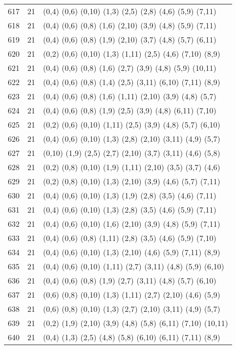 {\begin{longtable}{lll}
617 & 21 & (0,4) (0,6) (0,10) (1,3) (2,5) (2,8) (4,6) (5,9) (7,11) \\
618 & 21 & (0,4) (0,6) (0,8) (1,6) (2,10) (3,9) (4,8) (5,9) (7,11) \\
619 & 21 & (0,4) (0,6) (0,8) (1,9) (2,10) (3,7) (4,8) (5,7) (6,11) \\
620 & 21 & (0,2) (0,6) (0,10) (1,3) (1,11) (2,5) (4,6) (7,10) (8,9) \\
621 & 21 & (0,4) (0,6) (0,8) (1,6) (2,7) (3,9) (4,8) (5,9) (10,11) \\
622 & 21 & (0,4) (0,6) (0,8) (1,4) (2,5) (3,11) (6,10) (7,11) (8,9) \\
623 & 21 & (0,4) (0,6) (0,8) (1,6) (1,11) (2,10) (3,9) (4,8) (5,7) \\
624 & 21 & (0,4) (0,6) (0,8) (1,9) (2,5) (3,9) (4,8) (6,11) (7,10) \\
625 & 21 & (0,2) (0,6) (0,10) (1,11) (2,5) (3,9) (4,8) (5,7) (6,10) \\
626 & 21 & (0,4) (0,6) (0,10) (1,3) (2,8) (2,10) (3,11) (4,9) (5,7) \\
627 & 21 & (0,10) (1,9) (2,5) (2,7) (2,10) (3,7) (3,11) (4,6) (5,8) \\
628 & 21 & (0,2) (0,8) (0,10) (1,9) (1,11) (2,10) (3,5) (3,7) (4,6) \\
629 & 21 & (0,2) (0,8) (0,10) (1,3) (2,10) (3,9) (4,6) (5,7) (7,11) \\
630 & 21 & (0,4) (0,6) (0,10) (1,3) (1,9) (2,8) (3,5) (4,6) (7,11) \\
631 & 21 & (0,4) (0,6) (0,10) (1,3) (2,8) (3,5) (4,6) (5,9) (7,11) \\
632 & 21 & (0,4) (0,6) (0,10) (1,6) (2,10) (3,9) (4,8) (5,9) (7,11) \\
633 & 21 & (0,4) (0,6) (0,8) (1,11) (2,8) (3,5) (4,6) (5,9) (7,10) \\
634 & 21 & (0,4) (0,6) (0,10) (1,3) (2,10) (4,6) (5,9) (7,11) (8,9) \\
635 & 21 & (0,4) (0,6) (0,10) (1,11) (2,7) (3,11) (4,8) (5,9) (6,10) \\
636 & 21 & (0,4) (0,6) (0,8) (1,9) (2,7) (3,11) (4,8) (5,7) (6,10) \\
637 & 21 & (0,6) (0,8) (0,10) (1,3) (1,11) (2,7) (2,10) (4,6) (5,9) \\
638 & 21 & (0,6) (0,8) (0,10) (1,3) (2,7) (2,10) (3,11) (4,9) (5,7) \\
639 & 21 & (0,2) (1,9) (2,10) (3,9) (4,8) (5,8) (6,11) (7,10) (10,11) \\
640 & 21 & (0,4) (1,3) (2,5) (4,8) (5,8) (6,10) (6,11) (7,11) (8,9) \\

\end{longtable}}
